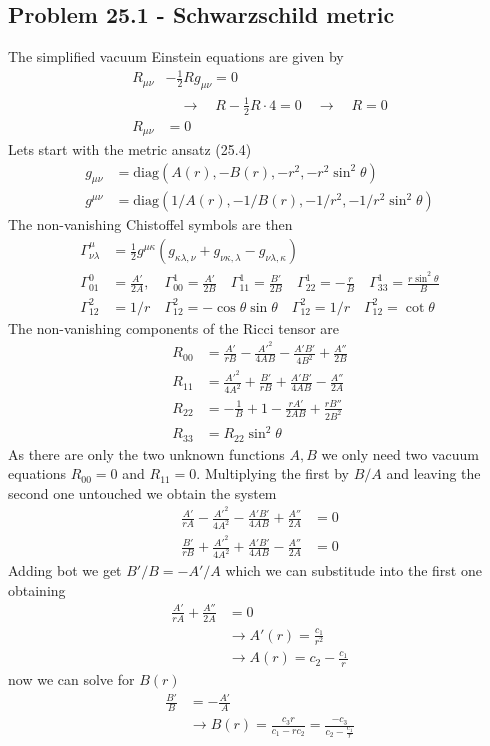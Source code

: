 \documentclass[10pt,a4paper]{book}
\theoremstyle{definition}
\begin{document}
\subsection{Problem 25.1 - Schwarzschild metric}
The simplified vacuum Einstein equations are given by
\begin{align}
R_{\mu\nu}&-\frac{1}{2}Rg_{\mu\nu}=0\\
&\quad\rightarrow\quad R-\frac{1}{2}R\cdot 4=0\quad\rightarrow\quad R=0\\
R_{\mu\nu}&=0
\end{align}
Lets start with the metric ansatz (25.4) 
\begin{align}
g_{\mu\nu}&=\text{diag}(A(r),-B(r),-r^2,-r^2\sin^2\theta)\\
g^{\mu\nu}&=\text{diag}(1/A(r),-1/B(r),-1/r^2,-1/r^2\sin^2\theta)
\end{align}
The non-vanishing Chistoffel symbols are then
\begin{align}
\Gamma^\mu_{\nu\lambda}&=\frac{1}{2}g^{\mu\kappa}(g_{\kappa\lambda,\nu}+g_{\nu\kappa,\lambda}-g_{\nu\lambda,\kappa})\\
\Gamma^0_{01}&=\frac{A'}{2A},\quad
\Gamma^1_{00}=\frac{A'}{2B}\quad
\Gamma^1_{11}=\frac{B'}{2B}\quad
\Gamma^1_{22}=-\frac{r}{B}\quad
\Gamma^1_{33}=\frac{r\sin^2\theta}{B}\\
\Gamma^2_{12}&=1/r\quad
\Gamma^2_{12}=-\cos\theta\sin\theta\quad
\Gamma^2_{12}=1/r\quad
\Gamma^2_{12}=\cot\theta
\end{align}
The non-vanishing components of the Ricci tensor are
\begin{align}
R_{00}&=\frac{A'}{rB}-\frac{A'^2}{4AB}-\frac{A'B'}{4B^2}+\frac{A''}{2B}\\
R_{11}&=\frac{A'^2}{4A^2}+\frac{B'}{rB}+\frac{A'B'}{4AB}-\frac{A''}{2A}\\
R_{22}&=-\frac{1}{B}+1-\frac{rA'}{2AB}+\frac{rB''}{2B^2}\\
R_{33}&=R_{22}\sin^2\theta
\end{align}
As there are only the two unknown functions $A, B$ we only need two vacuum equations $R_{00}=0$ and $R_{11}=0$. Multiplying the first by $B/A$ and leaving the second  one untouched we obtain the system
\begin{align}
\frac{A'}{rA}-\frac{A'^2}{4A^2}-\frac{A'B'}{4AB}+\frac{A''}{2A}&=0\\
\frac{B'}{rB}+\frac{A'^2}{4A^2}+\frac{A'B'}{4AB}-\frac{A''}{2A}&=0
\end{align}
Adding bot we get $B'/B=-A'/A$ which we can substitude into the first one obtaining
\begin{align}
\frac{A'}{rA}+\frac{A''}{2A}&=0\\
&\rightarrow A'(r)=\frac{c_1}{r^2}\\
&\rightarrow A(r)=c_2-\frac{c_1}{r}
\end{align}
now we can solve for $B(r)$
\begin{align}
\frac{B'}{B}&=-\frac{A'}{A}\\
&\rightarrow B(r)=\frac{c_3 r}{c_1-rc_2}=\frac{-c_3}{c_2-\frac{c_1}{r}}
\end{align}
\end{document}
